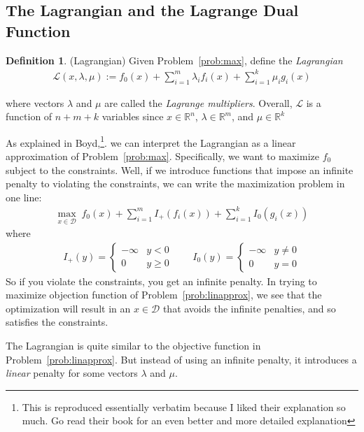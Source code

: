 \documentclass[12pt]{article}
\numberwithin{equation}{section} %
\theoremstyle{plain}
\theoremstyle{definition}
\newtheorem{defn}[thm]{Definition}
\theoremstyle{remark}
\newcommand{\sL}{\mathscr{L}}
\newcommand{\Rn}{\mathbb{R}^n}
\begin{document}
\subsection{The Lagrangian and the Lagrange Dual Function}

\begin{defn}{(Lagrangian)}
Given Problem~\ref{prob:max}, define the \emph{Lagrangian}
\begin{align*}
    \sL(x,\lambda,\mu)
    := f_0(x)
    + \sum^m_{i=1} \lambda_i f_i(x)
    + \sum^k_{i=1} \mu_i g_i(x)
\end{align*}

where vectors $\lambda$ and $\mu$ are called the \emph{Lagrange
multipliers}. Overall, $\sL$ is a function of $n+m+k$ variables since
$x\in\Rn$, $\lambda\in\mathbb{R}^m$, and $\mu\in\mathbb{R}^k$
\end{defn}

As explained in Boyd,\footnote{This is reproduced essentially verbatim
because I liked their explanation so much. Go read their book for an
even better and more detailed explanation}.  we can interpret the
Lagrangian as a linear approximation of Problem~\ref{prob:max}.
Specifically, we want to maximize $f_0$ subject to the constraints.
Well, if we introduce functions that impose an infinite penalty to
violating the constraints, we can write the maximization problem in one
line:
\begin{align}
  \label{prob:linapprox}
  \max_{x\in\mathcal{D}} \;
  f_0(x) + \sum^m_{i=1} I_+(f_i(x))
  + \sum^k_{i=1} I_0(g_i(x))
\end{align}
where
\begin{align*}
  I_+(y) =
  \begin{cases}
    -\infty & y < 0 \\
    0 & y \geq 0
  \end{cases}
  \qquad
  I_0(y) =
  \begin{cases}
    -\infty & y \neq 0 \\
    0 & y = 0
  \end{cases}
\end{align*}
So if you violate the constraints, you get an infinite penalty.  In
trying to maximize objection function of Problem~\ref{prob:linapprox},
we see that the optimization will result in an $x\in\mathcal{D}$ that
avoids the infinite penalties, and so satisfies the constraints.

The Lagrangian is quite similar to the objective function in
Problem~\ref{prob:linapprox}. But instead of using an infinite penalty,
it introduces a \emph{linear} penalty for some vectors $\lambda$ and
$\mu$.
\end{document}
